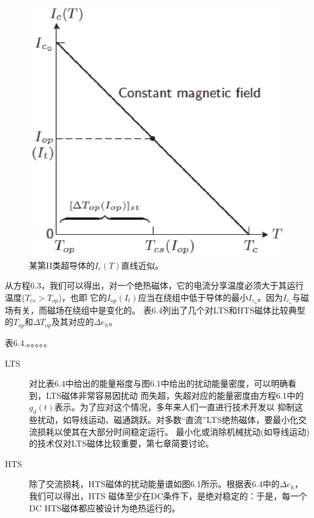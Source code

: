 \begin{figure}[htbp]
	\centering
	\includegraphics[scale=0.7]{chpt6/figs/fig6.2.eps}
	\caption{某第II类超导体的$I_c(T)$直线近似。}
\end{figure}
从方程6.3，我们可以得出，对一个绝热磁体，它的电流分享温度必须大于其运行温度($T_{cs}>T_{op}$)，也即
它的$I_{op}(I_t)$应当在绕组中低于导体的最小$I_{c_o}$。因为$I_{c_o}$与磁场有关，而磁场在绕组中是变化的。
表6.4列出了几个对LTS和HTS磁体比较典型的$T_{op}$和$\Delta T_{op}$及其对应的$\Delta e_h$。

表6.4.。。。。。

\begin{description}
	\item[LTS] 对比表6.4中给出的能量裕度与图6.1中给出的扰动能量密度，可以明确看到，LTS磁体非常容易因扰动
	而失超，失超对应的能量密度由方程6.1中的$g_d(t)$表示。为了应对这个情况，多年来人们一直进行技术开发以
	抑制这些扰动，如导线运动、磁通跳跃。对多数“直流”LTS绝热磁体，要最小化交流损耗以使其在大部分时间稳定运行。
	最小化或消除机械扰动(如导线运动)的技术仅对LTS磁体比较重要，第七章简要讨论。
	\item[HTS] 除了交流损耗，HTS磁体的扰动能量谱如图6.1所示。根据表6.4中的$\Delta e_h$，我们可以得出，HTS
	磁体至少在DC条件下，是绝对稳定的：于是，每一个DC HTS磁体都应被设计为绝热运行的。
\end{description}

